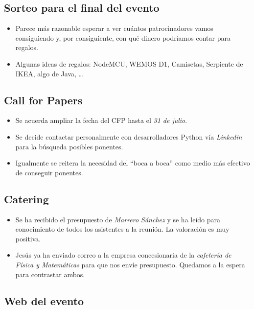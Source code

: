 \documentclass[a4paper, 12pt]{article}
\begin{document}
\subsection*{Sorteo para el final del evento}

\begin{itemize}
    \item Parece más razonable esperar a ver cuántos patrocinadores vamos consiguiendo y, por consiguiente, con qué dinero podríamos contar para regalos.
    \item Algunas ideas de regalos: NodeMCU, WEMOS D1, Camisetas, Serpiente de IKEA, algo de Java, \ldots
\end{itemize}

\subsection*{Call for Papers}

\begin{itemize}
    \item Se acuerda ampliar la fecha del CFP hasta el \textit{31 de julio}.
    \item Se decide contactar personalmente con desarrolladores Python vía \textit{Linkedin} para la búsqueda posibles ponentes.
    \item Igualmente se reitera la necesidad del ``boca a boca'' como medio más efectivo de conseguir ponentes.
\end{itemize}

\subsection*{Catering}

\begin{itemize}
    \item Se ha recibido el presupuesto de \textit{Marrero Sánchez} y se ha leído para conocimiento de todos los asistentes a la reunión. La valoración es muy positiva.
    \item Jesús ya ha enviado correo a la empresa concesionaria de la \textit{cafetería de Física y Matemáticas} para que nos envíe presupuesto. Quedamos a la espera para contrastar ambos.
\end{itemize}

\subsection*{Web del evento}
\end{document}
